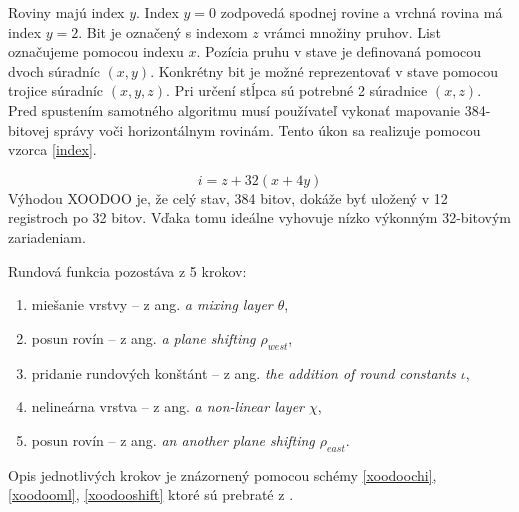 Roviny majú index $y$. Index $y=0$ zodpovedá spodnej rovine a vrchná rovina má index $y=2$. Bit je označený s indexom $z$ vrámci množiny pruhov. List označujeme pomocou indexu $x$. Pozícia pruhu v stave je definovaná pomocou dvoch súradníc $(x,y)$. Konkrétny bit je možné reprezentovať v stave pomocou trojice súradníc $(x,y,z)$. Pri určení stĺpca sú potrebné 2 súradnice $(x,z)$. Pred spustením samotného algoritmu musí používateľ vykonať mapovanie 384-bitovej správy voči horizontálnym rovinám. Tento úkon sa realizuje pomocou vzorca \ref{index}.

\begin{equation}\label{index}
	i=z+32(x+4y)
\end{equation}
Výhodou XOODOO je, že celý stav, 384 bitov, dokáže byť uložený v 12 registroch po 32 bitov. Vďaka tomu ideálne vyhovuje nízko výkonným 32-bitovým zariadeniam.

Rundová funkcia pozostáva z 5 krokov:
\begin{enumerate}
	\item miešanie vrstvy -- z ang. \textit{a mixing layer $\theta$}, 
	\item posun rovín -- z ang. \textit{a plane shifting $\rho_{west}$}, 
	\item pridanie rundových konštánt -- z ang. \textit{the addition of round constants $\iota$},
	\item nelineárna vrstva -- z ang. \textit{a non-linear layer $\chi$},
	\item posun rovín -- z ang. \textit{an another plane shifting $\rho_{east}$}.
\end{enumerate}
Opis jednotlivých krokov je znázornený pomocou schémy \ref{xoodoochi}, \ref{xoodooml}, \ref{xoodooshift} ktoré sú prebraté z \cite{xcb}.  

